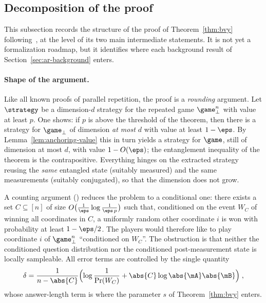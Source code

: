 \subsection{Decomposition of the proof}
\label{sec:ar-decomposition}

This subsection records the structure of the proof of Theorem~\ref{thm:bvy}
following~\cite{BVY17}, at the level of its two main intermediate statements. It is
not yet a formalization roadmap, but it identifies where each background result of
Section~\ref{sec:ar-background} enters.

\paragraph{Shape of the argument.} Like all known proofs of parallel repetition, the
proof is a \emph{rounding} argument. Let $\strategy$ be a dimension-$d$ strategy for
the repeated game $\game_\perp^{n}$ with value at least $p$. One shows: if $p$ is
above the threshold of the theorem, then there is a strategy for $\game_\perp$ of
dimension \emph{at most $d$} with value at least $1 - \eps$. By
Lemma~\ref{lem:anchoring-value} this in turn yields a strategy for $\game$, still of
dimension at most $d$, with value $1 - O(\eps)$; the entanglement inequality of the
theorem is the contrapositive. Everything hinges on the extracted strategy reusing the
\emph{same} entangled state (suitably measured) and the same measurements (suitably
conjugated), so that the dimension does not grow.

A counting argument (\cite[Proposition 6.5]{BVY17}) reduces the problem to a
conditional one: there exists a set $C \subseteq [n]$ of size $O\bigl(\frac{1}{\eps}
\log \frac{1}{\eps\, p}\bigr)$ such that, conditioned on the event $W_C$ of winning
all coordinates in $C$, a uniformly random other coordinate $i$ is won with
probability at least $1 - \eps/2$. The players would therefore like to play
coordinate $i$ of $\game_\perp^n$ ``conditioned on $W_C$''. The obstruction is that
neither the conditioned question distribution nor the conditioned post-measurement
state is locally sampleable. All error terms are controlled by the single quantity
\begin{equation}
\label{eq:ar-delta}
  \delta = \frac{1}{n - \abs{C}} \Bigl( \log \frac{1}{\Pr(W_C)} + \abs{C} \log
  \abs{\mA} \abs{\mB} \Bigr)\;,
\end{equation}
whose answer-length term is where the parameter $s$ of Theorem~\ref{thm:bvy} enters.

